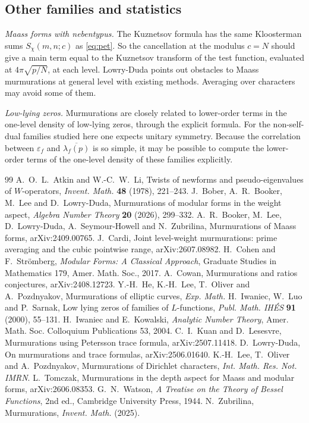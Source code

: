 \documentclass[11pt]{amsart}
\theoremstyle{remark}
\newcommand{\eps}{\varepsilon}
\newcommand{\ov}{\overline}
\begin{document}
\subsection{Other families and statistics}
\emph{Maass forms with nebentypus.} The Kuznetsov formula has the same Kloosterman sums $S_\chi(m,n;c)$ as \eqref{eq:pet}. So the cancellation at the modulus $c=N$ should give a main term equal to the Kuznetsov transform of the test function, evaluated at $4\pi\sqrt{p/N}$, at each level. Lowry-Duda \cite{LD} points out obstacles to Maass murmurations at general level with existing methods. Averaging over characters may avoid some of them.

\emph{Low-lying zeros.} Murmurations are closely related to lower-order terms in the one-level density of low-lying zeros, through the explicit formula. For the non-self-dual families studied here one expects unitary symmetry. Because the correlation between $\eps_f$ and $\ov{\lambda_f(p)}$ is so simple, it may be possible to compute the lower-order terms of the one-level density of these families explicitly.

\begin{thebibliography}{99}
 A.~O.~L.~Atkin and W.-C.~W.~Li, Twists of newforms and pseudo-eigenvalues of $W$-operators, \emph{Invent. Math.} \textbf{48} (1978), 221--243.
 J.~Bober, A.~R.~Booker, M.~Lee and D.~Lowry-Duda, Murmurations of modular forms in the weight aspect, \emph{Algebra Number Theory} \textbf{20} (2026), 299--332.
 A.~R.~Booker, M.~Lee, D.~Lowry-Duda, A.~Seymour-Howell and N.~Zubrilina, Murmurations of Maass forms, arXiv:2409.00765.
 J.~Cardi, Joint level-weight murmurations: prime averaging and the cubic pointwise range, arXiv:2607.08982.
 H.~Cohen and F.~Str\"omberg, \emph{Modular Forms: A Classical Approach}, Graduate Studies in Mathematics 179, Amer. Math. Soc., 2017.
 A.~Cowan, Murmurations and ratios conjectures, arXiv:2408.12723.
 Y.-H.~He, K.-H.~Lee, T.~Oliver and A.~Pozdnyakov, Murmurations of elliptic curves, \emph{Exp. Math.}
 H.~Iwaniec, W.~Luo and P.~Sarnak, Low lying zeros of families of $L$-functions, \emph{Publ. Math. IH\'ES} \textbf{91} (2000), 55--131.
 H.~Iwaniec and E.~Kowalski, \emph{Analytic Number Theory}, Amer. Math. Soc. Colloquium Publications 53, 2004.
 C.~I.~Kuan and D.~Lesesvre, Murmurations using Petersson trace formula, arXiv:2507.11418.
 D.~Lowry-Duda, On murmurations and trace formulas, arXiv:2506.01640.
 K.-H.~Lee, T.~Oliver and A.~Pozdnyakov, Murmurations of Dirichlet characters, \emph{Int. Math. Res. Not. IMRN}.
 L.~Tomczak, Murmurations in the depth aspect for Maass and modular forms, arXiv:2606.08353.
 G.~N.~Watson, \emph{A Treatise on the Theory of Bessel Functions}, 2nd ed., Cambridge University Press, 1944.
 N.~Zubrilina, Murmurations, \emph{Invent. Math.} (2025).
\end{thebibliography}
\end{document}
